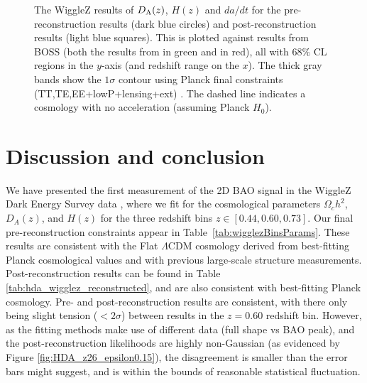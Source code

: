 \documentclass[a4paper,fleqn,usenatbib]{mnras}
\begin{document}
\begin{figure}
\begin{center}
\caption{The WiggleZ results of $D_{\rm A}(z)$, $H(z)$ and $da/dt$ for the pre-reconstruction results (dark blue circles) and post-reconstruction results (light blue squares). This is plotted against results from BOSS (both the results from \citet{AndersonAubourg2014} in green and \citet{AlamAta2016} in red), all with 68$\%$ CL regions in the $y$-axis (and redshift range on the $x$). The thick gray bands show the $1\sigma$ contour using Planck final constraints (TT,TE,EE+lowP+lensing+ext) \citep{Planck2015Parameters}. The dashed line indicates a cosmology with no acceleration (assuming Planck $H_0$).}
\label{fig:hubble_diagram}
\end{center}
\end{figure}










\section{Discussion and conclusion}

\label{sec:disc}
\label{sec:conclusion}



We have presented the first measurement of the 2D BAO signal in the WiggleZ Dark Energy Survey data \citep{KazinKoda2014}, where we fit for the cosmological parameters $\Omega_c h^2$, $D_A(z)$, and $H(z)$ for the three redshift bins $z \in \left[0.44, 0.60, 0.73\right]$.  Our final pre-reconstruction constraints appear in Table~\ref{tab:wigglezBinsParams}.  These results are consistent with the Flat $\Lambda$CDM cosmology derived from best-fitting Planck cosmological values and with previous large-scale structure measurements. Post-reconstruction results can be found in Table \ref{tab:hda_wigglez_reconstructed}, and are also consistent with best-fitting Planck cosmology. Pre- and post-reconstruction results are consistent, with there only being slight tension ($<2\sigma$) between results in the $z=0.60$ redshift bin. However, as the fitting methods make use of different data (full shape vs BAO peak), and the post-reconstruction likelihoods are highly non-Gaussian (as evidenced by Figure \ref{fig:HDA_z26_epsilon0.15}), the disagreement is smaller than the error bars might suggest, and is within the bounds of reasonable statistical fluctuation.
\end{document}
